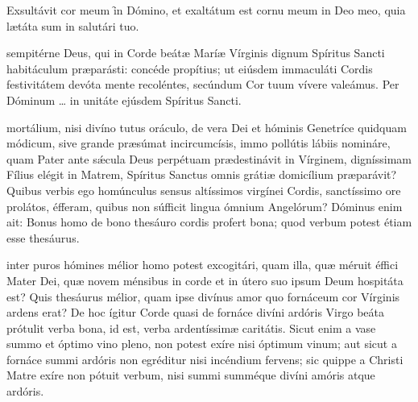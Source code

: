 \documentclass[fontsize=7.9pt,paper=A6,twoside,BCOR=1mm,DIV=24,headinclude]{scrarticle}
\begin{document}

\null 

\vspace{-7em}

\begin{multicols}{2}
\thispagestyle{empty}


{



\VRBMVi

\M Exsultávit cor meum \f in Dómino, et exaltátum est cornu meum in Deo meo, quia lætáta sum in salutári tuo.

 sempitérne Deus, qui in Corde beátæ Maríæ Vírginis dignum Spíritus Sancti habitáculum præparásti: concéde propítius; ut eiúsdem immaculáti Cordis festivitátem devóta mente recoléntes, secúndum Cor tuum vívere valeámus. Per Dóminum … in unitáte ejúsdem Spíritus Sancti.




 mortálium, nisi divíno tutus oráculo, de vera Dei et hóminis Genetríce quidquam módicum, sive grande præsúmat incircumcísis, immo pollútis lábiis nomináre, quam Pater ante sǽcula Deus perpétuam prædestinávit in Vírginem, digníssimam Fílius elégit in Matrem, Spíritus Sanctus omnis grátiæ domicílium præparávit? Quibus verbis ego homúnculus sensus altíssimos virgínei Cordis, sanctíssimo ore prolátos, éfferam, quibus non súfficit lingua ómnium Angelórum? Dóminus enim ait: Bonus homo de bono thesáuro cordis profert bona; quod verbum potest étiam esse thesáurus.

\mRVBMVv

 inter puros hómines mélior homo potest excogitári, quam illa, quæ méruit éffici Mater Dei, quæ novem ménsibus in corde et in útero suo ipsum Deum hospitáta est? Quis thesáurus mélior, quam ipse divínus amor quo fornáceum cor Vírginis ardens erat?
De hoc ígitur Corde quasi de fornáce divíni ardóris Virgo beáta prótulit verba bona, id est, verba ardentíssimæ caritátis. Sicut enim a vase summo et óptimo vino pleno, non potest exíre nisi óptimum vinum; aut sicut a fornáce summi ardóris non egréditur nisi incéndium fervens; sic quippe a Christi Matre exíre non pótuit verbum, nisi summi summéque divíni amóris atque ardóris.

}
\end{multicols}
\end{document}
